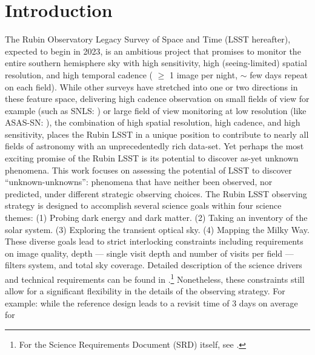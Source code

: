 \documentclass[onecolumn, 10pt]{aastex63}
\begin{document}


\section{Introduction} \label{sec:intro}

The Rubin Observatory Legacy Survey of Space and Time (LSST hereafter), expected to begin in 2023, is an ambitious project that promises to monitor the entire southern hemisphere sky with high sensitivity, high {(seeing-limited) spatial} resolution, and high temporal cadence (
$\geq$ 1 image per night,  $\sim$ few days repeat on each field). While other surveys have stretched into one or two directions in these feature space, delivering high cadence observation on small fields of view for example (such as SNLS: \citealt{snls}) or large field of view monitoring at low resolution (like ASAS-SN: \citealt{asas-sn}), {the combination of} high spatial resolution, high cadence, and high sensitivity, places the Rubin LSST  in a unique position to contribute to nearly all fields of astronomy with an unprecedentedly rich data-set. Yet perhaps the most exciting promise of the Rubin LSST is its potential to discover as-yet unknown phenomena. This work focuses on assessing the potential of LSST to discover ``unknown-unknowns'': phenomena that have neither been observed, nor predicted, under different strategic observing choices. 
The Rubin LSST observing strategy is designed to accomplish several science goals within four science themes: (1) Probing dark energy and dark matter.
(2) Taking an inventory of the solar system.
(3) Exploring the transient optical sky.
(4) Mapping the Milky Way. These diverse goals lead to strict interlocking constraints including requirements on image quality, depth --- single visit depth and number of visits per field --- filters system, and total sky coverage. Detailed description of the science drivers and technical requirements can be found in \citet{lsst}.\footnote{For the Science Requirements Document (SRD) itself, see \citet{lsstSRD}.} Nonetheless, these constraints still allow for a significant flexibility in the details of the observing strategy. For example: while the reference design \citep[e.g.][]{designSystem, designCamera} leads to a revisit time of 3 days on average for 
\end{document}
